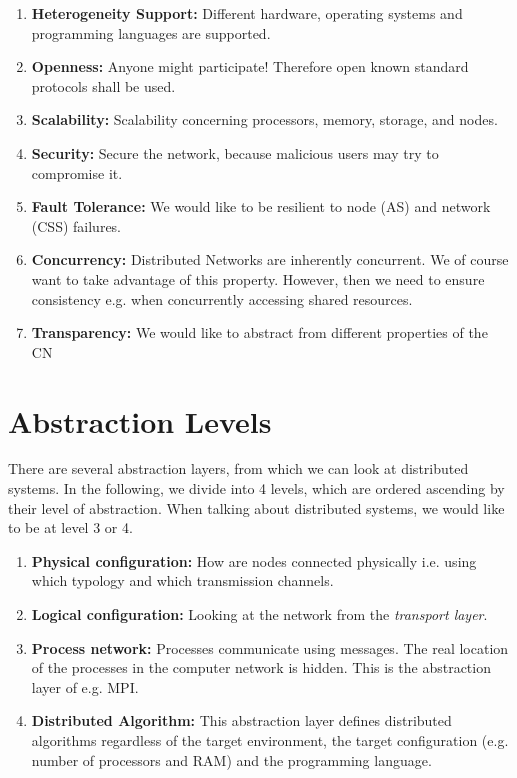 \begin{enumerate}
    \item \textbf{Heterogeneity Support:} Different hardware, operating systems and programming languages are supported.
    \item \textbf{Openness:} Anyone might participate! Therefore open known standard protocols shall be used.
    \item \textbf{Scalability:} Scalability concerning processors, memory, storage, and nodes.
    \item \textbf{Security:} Secure the network, because malicious users may try to compromise it.
    \item \textbf{Fault Tolerance:} We would like to be resilient to node (\ac{AS}) and network (\ac{CSS}) failures.
    \item \textbf{Concurrency:} Distributed Networks are inherently concurrent. We of course want to take advantage of this property. However, then we need to ensure consistency e.g. when concurrently accessing shared resources.
    \item \textbf{Transparency:} We would like to abstract from different properties of the \ac{CN}
\end{enumerate}

\section{Abstraction Levels}

There are several abstraction layers, from which we can look at distributed systems. In the following, we divide into 4 levels, which are ordered ascending by their level of abstraction. When talking about distributed systems, we would like to be at level 3 or 4.

\begin{enumerate}
    \item \textbf{Physical configuration:} How are nodes connected physically i.e. using which typology and which transmission channels.
    \item \textbf{Logical configuration:} Looking at the network from the \textit{transport layer}.
    \item \textbf{Process network:} Processes communicate using messages. The real location of the processes in the computer network is hidden. This is the abstraction layer of e.g. MPI.
    \item \textbf{Distributed Algorithm:} This abstraction layer defines distributed algorithms regardless of the target environment, the target configuration (e.g. number of processors and RAM) and the programming language.
\end{enumerate}

